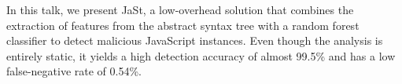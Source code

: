 \def\abstracttitle{JaSt: Fully Syntactic Detection of Malicious (Obfuscated) JavaScript}
\def\abstractcomment{Regular Talk}
\def\abstractowner{Aurore Fass}

\thispagestyle{abstract}

In this talk, we present JaSt, a low-overhead solution that combines the extraction of features from the abstract syntax tree with a random forest classifier to detect malicious JavaScript instances. Even though the analysis is entirely static, it yields a high detection accuracy of almost 99.5\% and has a low false-negative rate of 0.54\%.
